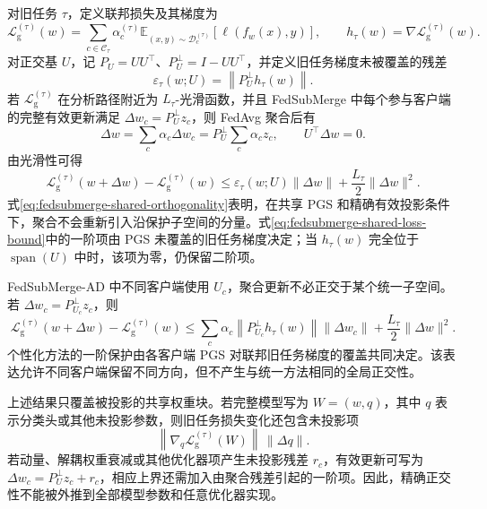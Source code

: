 对旧任务 $\tau$，定义联邦损失及其梯度为
\begin{equation}
\mathcal{L}_{\mathrm g}^{(\tau)}(w)
=
\sum_{c\in\mathcal{C}_{\tau}}
\alpha_c^{(\tau)}
\mathbb{E}_{(x,y)\sim\mathcal{D}_c^{(\tau)}}
\left[\ell(f_w(x),y)\right],
\qquad
h_{\tau}(w)=\nabla\mathcal{L}_{\mathrm g}^{(\tau)}(w).
\label{eq:fedsubmerge-old-task-loss}
\end{equation}
对正交基 $U$，记 $P_U=UU^{\top}$、$P_U^{\perp}=I-UU^{\top}$，并定义旧任务梯度未被覆盖的残差
\begin{equation}
\varepsilon_{\tau}(w;U)
=
\left\|P_U^{\perp}h_{\tau}(w)\right\|.
\label{eq:fedsubmerge-coverage-residual}
\end{equation}
若 $\mathcal{L}_{\mathrm g}^{(\tau)}$ 在分析路径附近为 $L_{\tau}$-光滑函数，并且 FedSubMerge 中每个参与客户端的完整有效更新满足
$\Delta w_c=P_U^{\perp}z_c$，则 FedAvg 聚合后有
\begin{equation}
\Delta w
=
\sum_c\alpha_c\Delta w_c
=
P_U^{\perp}\sum_c\alpha_c z_c,
\qquad
U^{\top}\Delta w=0.
\label{eq:fedsubmerge-shared-orthogonality}
\end{equation}
由光滑性可得
\begin{equation}
\mathcal{L}_{\mathrm g}^{(\tau)}(w+\Delta w)
-
\mathcal{L}_{\mathrm g}^{(\tau)}(w)
\leq
\varepsilon_{\tau}(w;U)\|\Delta w\|
+
\frac{L_{\tau}}{2}\|\Delta w\|^2.
\label{eq:fedsubmerge-shared-loss-bound}
\end{equation}
式\eqref{eq:fedsubmerge-shared-orthogonality}表明，在共享 PGS 和精确有效投影条件下，聚合不会重新引入沿保护子空间的分量。式\eqref{eq:fedsubmerge-shared-loss-bound}中的一阶项由 PGS 未覆盖的旧任务梯度决定；当 $h_{\tau}(w)$ 完全位于 $\operatorname{span}(U)$ 中时，该项为零，仍保留二阶项。

FedSubMerge-AD 中不同客户端使用 $U_c$，聚合更新不必正交于某个统一子空间。若 $\Delta w_c=P_{U_c}^{\perp}z_c$，则
\begin{equation}
\mathcal{L}_{\mathrm g}^{(\tau)}(w+\Delta w)
-
\mathcal{L}_{\mathrm g}^{(\tau)}(w)
\leq
\sum_c\alpha_c
\left\|P_{U_c}^{\perp}h_{\tau}(w)\right\|
\|\Delta w_c\|
+
\frac{L_{\tau}}{2}\|\Delta w\|^2.
\label{eq:fedsubmerge-personalized-loss-bound}
\end{equation}
个性化方法的一阶保护由各客户端 PGS 对联邦旧任务梯度的覆盖共同决定。该表达允许不同客户端保留不同方向，但不产生与统一方法相同的全局正交性。

上述结果只覆盖被投影的共享权重块。若完整模型写为 $W=(w,q)$，其中 $q$ 表示分类头或其他未投影参数，则旧任务损失变化还包含未投影项
\[
\left\|\nabla_q\mathcal{L}_{\mathrm g}^{(\tau)}(W)\right\|\,
\left\|\Delta q\right\|.
\]
若动量、解耦权重衰减或其他优化器项产生未投影残差 $r_c$，有效更新可写为
$\Delta w_c=P_U^{\perp}z_c+r_c$，相应上界还需加入由聚合残差引起的一阶项。因此，精确正交性不能被外推到全部模型参数和任意优化器实现。

